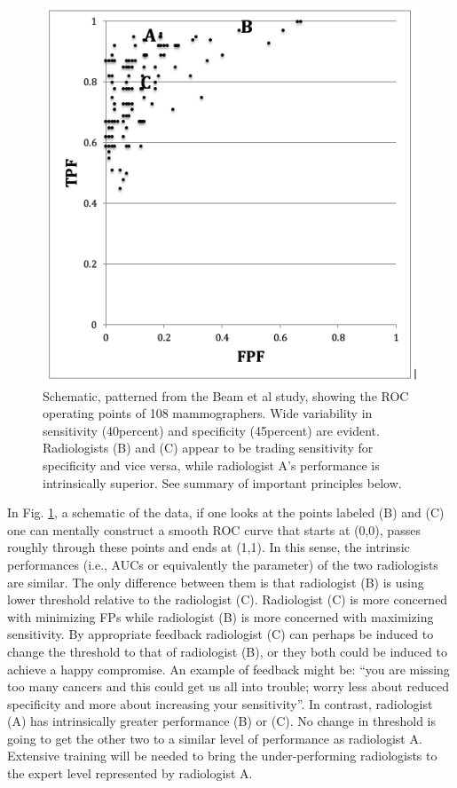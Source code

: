 \documentclass[
]{book}
\begin{document}
\begin{figure}
\includegraphics[width=0.8\linewidth]{images/BeamStudy} \caption{Schematic, patterned from the Beam et al study, showing the ROC operating points of 108 mammographers. Wide variability in sensitivity (40percent) and specificity (45percent) are evident. Radiologists (B) and (C) appear to be trading sensitivity for specificity and vice versa, while radiologist A's performance is intrinsically superior. See summary of important principles below.}\label{fig:BeamStudyFig}
\end{figure}

In Fig. \ref{fig:BeamStudyFig}, a schematic of the data, if one looks at the points labeled (B) and (C) one can mentally construct a smooth ROC curve that starts at (0,0), passes roughly through these points and ends at (1,1). In this sense, the intrinsic performances (i.e., AUCs or equivalently the parameter) of the two radiologists are similar. The only difference between them is that radiologist (B) is using lower threshold relative to the radiologist (C). Radiologist (C) is more concerned with minimizing FPs while radiologist (B) is more concerned with maximizing sensitivity. By appropriate feedback radiologist (C) can perhaps be induced to change the threshold to that of radiologist (B), or they both could be induced to achieve a happy compromise. An example of feedback might be: ``you are missing too many cancers and this could get us all into trouble; worry less about reduced specificity and more about increasing your sensitivity''. In contrast, radiologist (A) has intrinsically greater performance (B) or (C). No change in threshold is going to get the other two to a similar level of performance as radiologist A. Extensive training will be needed to bring the under-performing radiologists to the expert level represented by radiologist A.
\end{document}
